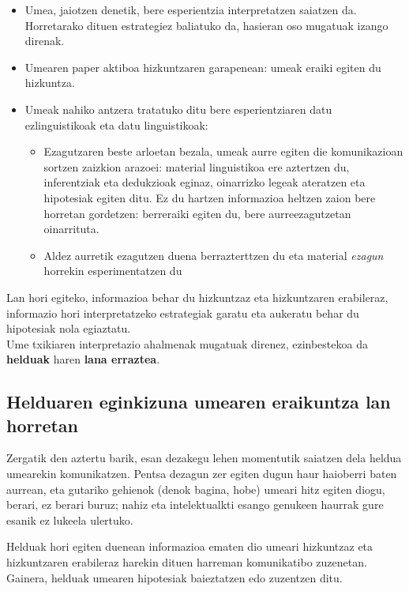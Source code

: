 \documentclass[
]{book}
\providecommand{\tightlist}{%
  \setlength{\itemsep}{0pt}\setlength{\parskip}{0pt}}
\begin{document}
\begin{itemize}
\tightlist
\item
  Umea, jaiotzen denetik, bere esperientzia interpretatzen saiatzen da. Horretarako dituen estrategiez baliatuko da, hasieran oso mugatuak izango direnak.
\item
  Umearen paper aktiboa hizkuntzaren garapenean: umeak eraiki egiten du hizkuntza.
\item
  Umeak nahiko antzera tratatuko ditu bere esperientziaren datu ezlinguistikoak eta datu linguistikoak:

  \begin{itemize}
  \tightlist
  \item
    Ezagutzaren beste arloetan bezala, umeak aurre egiten die komunikazioan sortzen zaizkion arazoei: material linguistikoa ere aztertzen du, inferentziak eta dedukzioak eginaz, oinarrizko legeak ateratzen eta hipotesiak egiten ditu. Ez du hartzen informazioa heltzen zaion bere horretan gordetzen: berreraiki egiten du, bere aurreezagutzetan oinarrituta.
  \item
    Aldez aurretik ezagutzen duena berrazterttzen du eta material \emph{ezagun} horrekin esperimentatzen du
  \end{itemize}
\end{itemize}

Lan hori egiteko, informazioa behar du hizkuntzaz eta hizkuntzaren erabileraz, informazio hori interpretatzeko estrategiak garatu eta aukeratu behar du hipotesiak nola egiaztatu.\\
Ume txikiaren interpretazio ahalmenak mugatuak direnez, ezinbestekoa da \textbf{helduak} haren \textbf{lana erraztea}.

\hypertarget{helduaren-eginkizuna-umearen-eraikuntza-lan-horretan}{%
\subsection{Helduaren eginkizuna umearen eraikuntza lan horretan}\label{helduaren-eginkizuna-umearen-eraikuntza-lan-horretan}}

Zergatik den aztertu barik, esan dezakegu lehen momentutik saiatzen dela heldua umearekin komunikatzen. Pentsa dezagun zer egiten dugun haur haioberri baten aurrean, eta gutariko gehienok (denok bagina, hobe) umeari hitz egiten diogu, berari, ez berari buruz; nahiz eta intelektualkti esango genukeen haurrak gure esanik ez lukeela ulertuko.

Helduak hori egiten duenean informazioa ematen dio umeari hizkuntzaz eta hizkuntzaren erabileraz harekin dituen harreman komunikatibo zuzenetan. Gainera, helduak umearen hipotesiak baieztatzen edo zuzentzen ditu.
\end{document}
